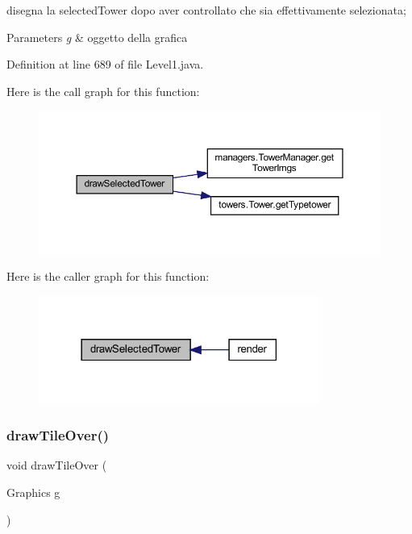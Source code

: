 disegna la selected\+Tower dopo aver controllato che sia effettivamente selezionata; 


\begin{DoxyParams}{Parameters}
{\em g} & oggetto della grafica \\
\hline
\end{DoxyParams}


Definition at line 689 of file Level1.\+java.

Here is the call graph for this function\+:\nopagebreak
\begin{figure}[H]
\begin{center}
\leavevmode
\includegraphics[width=350pt]{classscenes_1_1_level1_a0a97d0bb6d32640b2ae351707946abf7_cgraph}
\end{center}
\end{figure}
Here is the caller graph for this function\+:\nopagebreak
\begin{figure}[H]
\begin{center}
\leavevmode
\includegraphics[width=261pt]{classscenes_1_1_level1_a0a97d0bb6d32640b2ae351707946abf7_icgraph}
\end{center}
\end{figure}
\mbox{\label{classscenes_1_1_level1_ac299bbbbb70f97ae032c1345d5937378}} 
\subsubsection{\texorpdfstring{draw\+Tile\+Over()}{drawTileOver()}}
{\footnotesize\ttfamily void draw\+Tile\+Over (\begin{DoxyParamCaption}\item[{Graphics}]{g }\end{DoxyParamCaption})\hspace{0.3cm}{\ttfamily [private]}}



